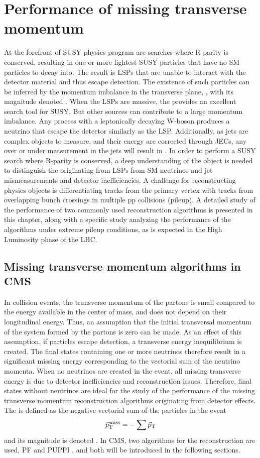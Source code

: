 \chapter{Performance of missing transverse momentum}\label{}
At the forefront of SUSY physics program are searches where R-parity is conserved, resulting in one or more lightest SUSY particles that have no SM particles to decay into. 
The result is LSPs that are unable to interact with the detector material and thus escape detection.
The existence of such particles can be inferred by the momentum imbalance in the transverse plane, \ptvecmiss, with its magnitude denoted \ptmiss. 
When the LSPs are massive, the \ptmiss provides an excellent search tool for SUSY. But other sources can contribute to a large momentum imbalance. 
Any process with a leptonically decaying W-boson produces a neutrino that escape the detector similarly as the LSP. 
Additionally, as jets are complex objects to measure, and their energy are corrected through JECs, any over or under measurement in the jets will result in \ptmiss. 
In order to perform a SUSY search where R-parity is conserved, a deep understanding of the \ptmiss object is needed to distinguish the \ptmiss originating from LSPs from SM neutrinos and jet mismeasurements and detector inefficiencies. 
A challenge for reconstructing physics objects is differentiating tracks from the primary vertex with tracks from overlapping bunch crossings in multiple pp collisions (pileup). 
A detailed study of the performance of two commonly used \ptmiss reconstruction algorithms is presented in this chapter, along with a specific study analyzing the performance of the algorithms under extreme pileup conditions, as is expected in the High Luminosity phase of the LHC.    
\section{Missing transverse momentum algorithms in CMS}
\label{sec:introduction}
In collision events, the transverse momentum of the partons is small compared to the energy available in the center of mass, and does not depend on their longitudinal energy. 
Thus, an assumption that the initial transversal momentum of the system formed by the partons is zero can be made. 
As an effect of this assumption, if particles escape detection, a transverse energy inequilibrium is created. 
The final states containing one or more neutrinos therefore result in a significant missing energy corresponding to the vectorial sum of the neutrino momenta. 
When no neutrinos are created in the event, all missing transverse energy is due to detector inefficiencies and reconstruction issues. 
Therefore, final states without neutrinos are ideal for the study of the performance of the missing transverse momentum reconstruction algorithms originating from detector effects.
The \ptmiss is defined as the negative vectorial sum of the particles in the event
\begin{equation}
{\vec p}_{\mathrm{T}}^{\kern1pt\text{miss}} =- \sum \vec{p}_{\mathrm{T}}
\end{equation}                                                                      
and its magnitude is denoted \ptmiss. 
In CMS, two algorithms for the \ptmiss reconstruction are used, PF \ptmiss and PUPPI \ptmiss, and both will be introduced in the following sections. 
